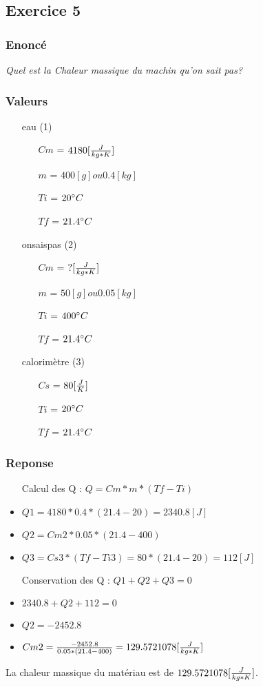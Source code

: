 \subsection{Exercice 5}
\subsubsection{Enoncé}


\textit{Quel est la Chaleur massique du machin qu'on sait pas?}
\subsubsection{Valeurs}
\begin{itemize}
    \item[eau] (1)
    \item[] 
    \begin{itemize}
        \item[$Cm$] = $4180[\cm]$
        \item[$m$] = $400[g] ou 0.4[kg]$
        \item[$Ti$] = $20\celsius$
        \item[$Tf$] = $21.4\celsius$  
    \end{itemize}
    \item[onsaispas] (2)
    \item[] 
    \begin{itemize}
        \item[$Cm$] = $?[\cm]$
        \item[$m$] = $50[g] ou 0.05[kg]$
        \item[$Ti$] = $400\celsius$
        \item[$Tf$] = $21.4\celsius$  
    \end{itemize}
    \item[calorimètre] (3)
    \item[] 
    \begin{itemize}
        \item[$Cs$] = $80[\cs]$
        \item[$Ti$] = $20\celsius$
        \item[$Tf$] = $21.4\celsius$
    \end{itemize} 
\end{itemize}
\subsubsection{Reponse}
\begin{itemize}
    \item[Calcul des Q] : $Q = Cm * m * (Tf-Ti)$
    \item $Q1 = 4180 * 0.4 * (21.4 - 20) = 2340.8[J]$
    \item $Q2 = Cm2 * 0.05 * (21.4 - 400)$
    \item $Q3 = Cs3 * (Tf-Ti3) = 80 * (21.4 - 20) = 112[J]$
    \item[Conservation des Q] : $Q1 + Q2 + Q3 = 0$
    \item $2340.8 + Q2 + 112 = 0$
    \item $Q2 = -2452.8$
    \item $Cm2 = \frac{-2452.8}{0.05 * (21.4 - 400)} = 129.5721078[\cm]$
\end{itemize}
La chaleur massique du matériau est de $129.5721078[\cm]$.
